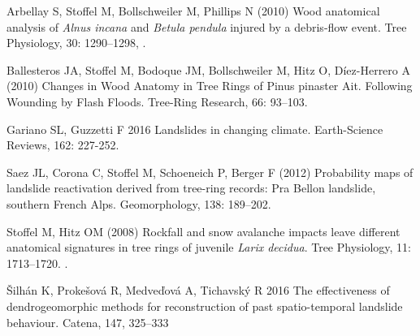 {Arbellay S, Stoffel M, Bollschweiler M, Phillips N (2010) Wood anatomical analysis of \textit{Alnus incana} and \textit{Betula pendula} injured by a debris-flow event. Tree Physiology, 30: 1290–1298, .

Ballesteros JA, Stoffel M, Bodoque JM, Bollschweiler M, Hitz O, Díez-Herrero A (2010) Changes in Wood Anatomy in Tree Rings of Pinus pinaster Ait. Following Wounding by Flash Floods. Tree-Ring Research, 66: 93–103. 

Gariano SL, Guzzetti F 2016 Landslides in changing climate. Earth-Science Reviews, 162: 227-252. 

Saez JL, Corona C, Stoffel M, Schoeneich P, Berger F (2012) Probability maps of landslide reactivation derived from tree-ring records: Pra Bellon landslide, southern French Alps. Geomorphology, 138: 189–202.
	
Stoffel M, Hitz OM (2008) Rockfall and snow avalanche impacts leave different anatomical signatures in tree rings of juvenile \textit{Larix decidua}. Tree Physiology, 11: 1713–1720. .

Šilhán K, Prokešová R, Medveďová A, Tichavský R 2016 The effectiveness of dendrogeomorphic methods for reconstruction of past spatio-temporal landslide behaviour. Catena, 147, 325–333
}


